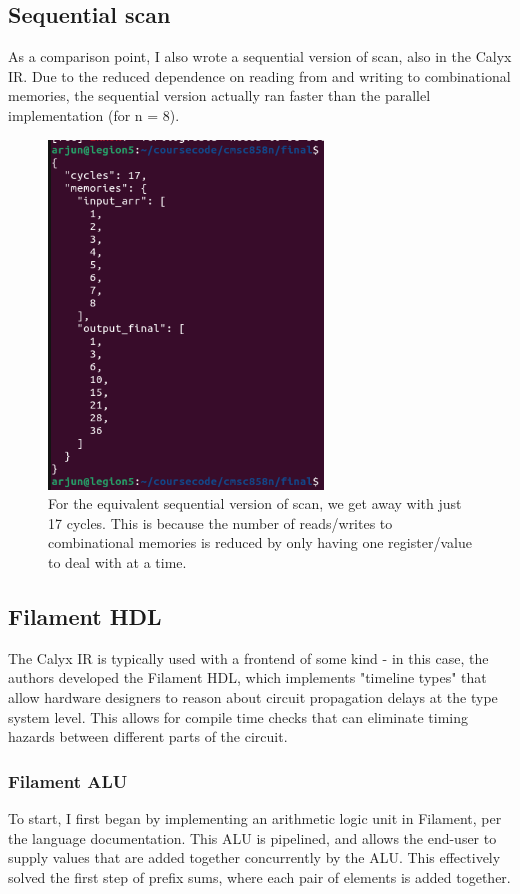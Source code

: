 \documentclass[12pt]{article}
\begin{document}
\subsection{Sequential scan}
As a comparison point, I also wrote a sequential version of scan, also in the Calyx IR. Due to the reduced dependence on
reading from and writing to combinational memories, the sequential version actually ran faster than the parallel implementation
(for n = 8).

\begin{figure}[H]
    \centering
    \includegraphics[height=25em]{images/seq_sums_scan.png}
    \caption{For the equivalent sequential version of scan, we get away with just 17 cycles. This is because the number of
    reads/writes to combinational memories is reduced by only having one register/value to deal with at a time. }
\end{figure}

\subsection{Filament HDL}
The Calyx IR is typically used with a frontend of some kind - in this case, the authors developed the Filament HDL, which
implements "timeline types" that allow hardware designers to reason about circuit propagation delays at the type system level.
This allows for compile time checks that can eliminate timing hazards between different parts of the circuit.

\subsubsection{Filament ALU}
To start, I first began by implementing an arithmetic logic unit in Filament, per the language documentation. This ALU is pipelined,
and allows the end-user to supply values that are added together concurrently by the ALU. This effectively solved the first step of
prefix sums, where each pair of elements is added together.
\end{document}
